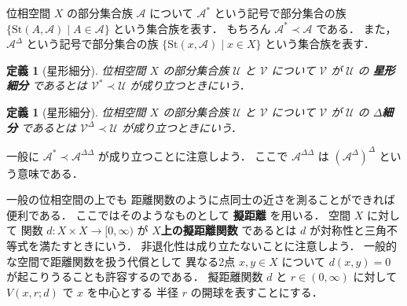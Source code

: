 \documentclass[leqno, a4paper, 12pt]{jsarticle}
\numberwithin{equation}{section}
\newtheorem{df}[thm]{定義}
\newcommand{\yocovfont}[1]{\mathscr{#1}}
\newcommand{\yofine}{\prec}
\newcommand{\yost}[1]{\mathrm{St}(#1)}
\newcommand{\yostfine}[1]{#1^{*}}
\newcommand{\yostfined}[1]{#1^{\Delta}}
\newcommand{\yostfinedd}[1]{#1^{\Delta\Delta}}
\newcommand{\yoball}[3]{V(#1, #2; #3)}
\begin{document}
位相空間
$X$
の部分集合族
$\yocovfont{A}$
について
$\yostfine{\yocovfont{A}}$
という記号で部分集合の族
$\{\yost{A, \yocovfont{A}}\mid A\in \yocovfont{A}\}$
という集合族を表す．
もちろん
$\yostfine{\yocovfont{A}}\yofine\yocovfont{A}$
である．
また，
$\yostfined{\yocovfont{A}}$
という記号で部分集合の族
$\{\yost{x, \yocovfont{A}}\mid x\in X\}$
という集合族を表す．



\begin{df}[星形細分]
位相空間
$X$
の部分集合族
$\yocovfont{U}$
と
$\yocovfont{V}$
について
$\yocovfont{V}$
が
$\yocovfont{U}$
の
\textbf{星形細分}
であるとは
$\yostfine{\yocovfont{V}}\yofine\yocovfont{U}$
が成り立つときにいう．
\end{df}

\begin{df}[星形細分]
位相空間
$X$
の部分集合族
$\yocovfont{U}$
と
$\yocovfont{V}$
について
$\yocovfont{V}$
が
$\yocovfont{U}$
の
\textbf{$\Delta$細分}
であるとは
$\yostfined{\yocovfont{V}}\yofine\yocovfont{U}$
が成り立つときにいう．
\end{df}
一般に
$\yostfine{\yocovfont{A}}\yofine{\yostfinedd{\yocovfont{A}}}$
が成り立つことに注意しよう．
ここで
${\yostfinedd{\yocovfont{A}}}$
は
$\yostfined{(\yostfined{\yocovfont{A}})}$
という意味である．



一般の位相空間の上でも
距離関数のように点同士の近さを測ることができれば
便利である．
ここではそのようなものとして
\textbf{擬距離}
を用いる．
空間
$X$
に対して
関数
$d\colon X\times X\to [0, \infty)$
が
\textbf{$X$上の擬距離関数}
であるとは
$d$
が対称性と三角不等式を満たすときにいう．
非退化性は成り立たないことに注意しよう．
一般的な空間で距離関数を扱う代償として
異なる2点
$x, y\in X$
について
$d(x, y)=0$
が起こりうることも許容するのである．
擬距離関数
$d$
と
$r\in (0, \infty)$
に対して
$\yoball{x}{r}{d}$
で
$x$
を中心とする
半径
$r$
の開球を表すことにする．
\end{document}
